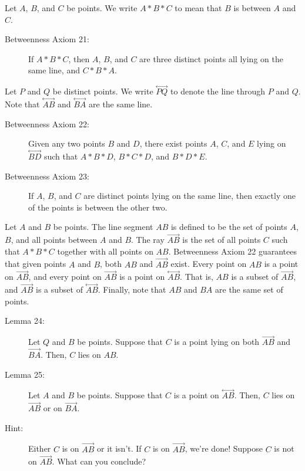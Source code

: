 \documentclass{article}
\newcommand{\linethrough}[1]{\stackrel{\longleftrightarrow}{#1} }
\newcommand{\ray}[1]{\stackrel{\longrightarrow}{#1} }
\begin{document}
Let $A$, $B$, and $C$ be points. We write $A*B*C$ to mean that $B$ is between $A$ and $C$.

\begin{description}

\item[Betweenness Axiom 21:] If $A*B*C$, then $A$, $B$, and $C$ are three distinct points all lying on the same line, and $C*B*A$.

\end{description}

Let $P$ and $Q$ be distinct points. We write $\linethrough{PQ}$ to denote the line through $P$ and $Q$. Note that $\linethrough{AB}$ and $\linethrough{BA}$ are the same line.

\begin{description}

\item[Betweenness Axiom 22:] Given any two points $B$ and $D$, there exist points $A$, $C$, and $E$ lying on $\linethrough{BD}$ such that $A*B*D$, $B*C*D$, and $B*D*E$.

\item[Betweenness Axiom 23:] If $A$, $B$, and $C$ are distinct points lying on the same line, then exactly one of the points is between the other two.

\end{description}

Let $A$ and $B$ be points. The line segment $AB$ is defined to be the set of points $A$, $B$, and all points between $A$ and $B$. The ray $\ray{AB}$ is the set of all points $C$ such that $A*B*C$ together with all points on $AB$. Betweenness Axiom 22 guarantees that given points $A$ and $B$, both $AB$ and $\ray{AB}$ exist. Every point on $AB$ is a point on $\ray{AB}$, and every point on $\ray{AB}$ is a point on $\linethrough{AB}$. That is, $AB$ is a subset of $\ray{AB}$, and $\ray{AB}$ is a subset of $\linethrough{AB}$. Finally, note that $AB$ and $BA$ are the same set of points.

\begin{description}

\item[Lemma 24:] Let $Q$ and $B$ be points. Suppose that $C$ is a point lying on both $\ray{AB}$ and $\ray{BA}$. Then, $C$ lies on $AB$.

\item[Lemma 25:] Let $A$ and $B$ be points. Suppose that $C$ is a point on $\linethrough{AB}$. Then, $C$ lies on $\ray{AB}$ or on $\ray{BA}$.

\item[Hint:] Either $C$ is on $\ray{AB}$ or it isn't. If $C$ is on $\ray{AB}$, we're done! Suppose $C$ is not on $\ray{AB}$. What can you conclude?

\end{description}
\end{document}
